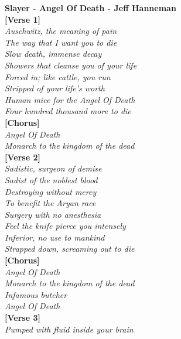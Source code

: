 \documentclass[twocolumn,10pt]{article}
\begin{document}
			\begin{center}
			\textbf{Slayer - Angel Of Death - Jeff Hanneman\cite{aodLyrics}}\\
			\textbf{[Verse 1]}\\
			\textit{Auschwitz, the meaning of pain}\\
			\textit{The way that I want you to die}\\
			\textit{Slow death, immense decay}\\
			\textit{Showers that cleanse you of your life}\\
			\textit{Forced in; like cattle, you run}\\
			\textit{Stripped of your life's worth}\\
			\textit{Human mice for the Angel Of Death}\\
			\textit{Four hundred thousand more to die}
			\vspace{10pt}\\
			\textbf{[Chorus]}\\
			\textit{Angel Of Death}\\
			\textit{Monarch to the kingdom of the dead}
			\vspace{10pt}\\
			\textbf{[Verse 2]}\\
			\textit{Sadistic, surgeon of demise}\\
			\textit{Sadist of the noblest blood}\\
			\textit{Destroying without mercy}\\
			\textit{To benefit the Aryan race}\\
			\textit{Surgery with no anesthesia}\\
			\textit{Feel the knife pierce you intensely}\\
			\textit{Inferior, no use to mankind}\\
			\textit{Strapped down, screaming out to die}
			\vspace{10pt}\\
			\textbf{[Chorus]}\\
			\textit{Angel Of Death}\\
			\textit{Monarch to the kingdom of the dead}\\
			\textit{Infamous butcher}\\
			\textit{Angel Of Death}
			\vspace{10pt}\\
			\textbf{[Verse 3]}\\
			\textit{Pumped with fluid inside your brain}\\

\end{center}
\end{document}
